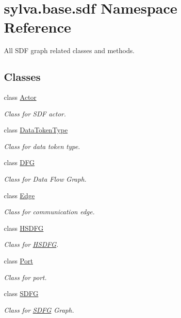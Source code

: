 \hypertarget{namespacesylva_1_1base_1_1sdf}{}\section{sylva.\+base.\+sdf Namespace Reference}
\label{namespacesylva_1_1base_1_1sdf}


All S\+DF graph related classes and methods.  


\subsection*{Classes}
\begin{DoxyCompactItemize}
\item 
class \hyperlink{classsylva_1_1base_1_1sdf_1_1_actor}{Actor}
\begin{DoxyCompactList}\small\item\em Class for S\+DF actor. \end{DoxyCompactList}\item 
class \hyperlink{classsylva_1_1base_1_1sdf_1_1_data_token_type}{Data\+Token\+Type}
\begin{DoxyCompactList}\small\item\em Class for data token type. \end{DoxyCompactList}\item 
class \hyperlink{classsylva_1_1base_1_1sdf_1_1_d_f_g}{D\+FG}
\begin{DoxyCompactList}\small\item\em Class for Data Flow Graph. \end{DoxyCompactList}\item 
class \hyperlink{classsylva_1_1base_1_1sdf_1_1_edge}{Edge}
\begin{DoxyCompactList}\small\item\em Class for communication edge. \end{DoxyCompactList}\item 
class \hyperlink{classsylva_1_1base_1_1sdf_1_1_h_s_d_f_g}{H\+S\+D\+FG}
\begin{DoxyCompactList}\small\item\em Class for \hyperlink{classsylva_1_1base_1_1sdf_1_1_h_s_d_f_g}{H\+S\+D\+FG}. \end{DoxyCompactList}\item 
class \hyperlink{classsylva_1_1base_1_1sdf_1_1_port}{Port}
\begin{DoxyCompactList}\small\item\em Class for port. \end{DoxyCompactList}\item 
class \hyperlink{classsylva_1_1base_1_1sdf_1_1_s_d_f_g}{S\+D\+FG}
\begin{DoxyCompactList}\small\item\em Class for \hyperlink{classsylva_1_1base_1_1sdf_1_1_s_d_f_g}{S\+D\+FG} Graph. \end{DoxyCompactList}\end{DoxyCompactItemize}
